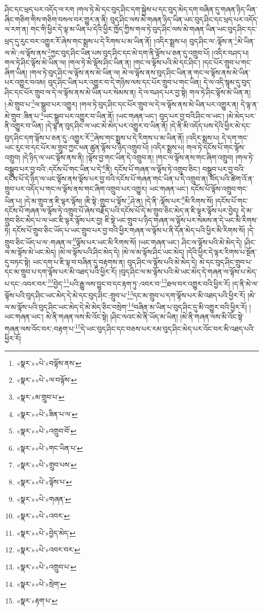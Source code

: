 ཤིང་དང་ཕྲད་པར་འདོད་ལ་རག །གལ་ཏེ་མེ་དང་བུད་ཤིང་དག་སྐྱེས་པ་དང་བུད་མེད་དག་བཞིན་དུ་གཞན་ཉིད་ཡིན་ཞིང་གཅིག་གིས་གཅིག་བསལ་བར་གྱུར་ན་ནི། བུད་ཤིང་ལས་མེ་གཞན་ཉིད་ཡིན་ཡང་བུད་ཤིང་དང་ཕྲད་པར་འདོད་ལ་རག་ན། གང་གི་ཕྱིར་དེ་ལྟ་མ་ཡིན་པ་དེའི་ཕྱིར་ཁྱོད་ཀྱིས་གལ་ཏེ་བུད་ཤིང་ལས་མེ་གཞན་ཡིན་ཡང་བུད་ཤིང་དང་ཕྲད་དུ་རུང་བར་འགྱུར་རོ་ཞེས་གང་སྨྲས་པ་དེ་རིགས་པ་མ་ཡིན་ནོ། །འདིར་སྨྲས་པ། བུད་ཤིང་ལ་:ལྟོས་ན་\footnote{«སྣར་»«པེ་»བལྟོས་ནས་}མེ་ཡིན་ལ་མེ་:ལ་ལྟོས་ནས་\footnote{«སྣར་»«པེ་»ལ་བལྟོས་}ཀྱང་བུད་ཤིང་ཡིན་པས་བུད་ཤིང་དང་མེ་དག་ནི་ལྟོས་པ་ཅན་དུ་འགྲུབ་པོ། །འདིར་བཤད་པ། གལ་ཏེ་ཤིང་ལྟོས་མེ་ཡིན་ལ། །གལ་ཏེ་མེ་ལྟོས་ཤིང་ཡིན་ན། །གང་ལ་ལྟོས་པའི་མེ་དང་ཤིང་། །དང་པོར་གྲུབ་པ་གང་ཞིག་ཡིན། །གལ་ཏེ་བུད་ཤིང་ལ་ལྟོས་ནས་མེ་ཡིན་ལ། མེ་ལ་ལྟོས་ནས་བུད་ཤིང་ཡིན་ན་གང་ལ་ལྟོས་ནས་མེ་ཡིན་པར་འགྱུར་བའམ། བུད་ཤིང་ཡིན་པར་འགྱུར་བ་དེ་གཉིས་ལས་དང་པོར་གྲུབ་པ་གང་ཡིན། དེ་ལ་འདི་སྙམ་དུ་བུད་ཤིང་དང་པོར་གྲུབ་ལ་དེ་ལ་ལྟོས་ནས་མེ་ཡིན་པར་སེམས་ན། དེ་ལ་བཤད་པར་བྱ་སྟེ། གལ་ཏེ་ཤིང་ལྟོས་མེ་ཡིན་ན། །:མེ་གྲུབ་པ་\footnote{«སྣར་»མ་གྲུབ་པ་}ལ་སྒྲུབ་པར་འགྱུར། །གལ་ཏེ་བུད་ཤིང་དང་པོར་གྲུབ་ལ་དེ་ལ་ལྟོས་ནས་མེ་ཡིན་པར་འགྱུར་ན། དེ་ལྟ་ན་མེ་གྲུབ་:ཟིན་པ་\footnote{«སྣར་»«པེ་»ཟིན་པ་ལ་}ཡང་སྒྲུབ་པར་འགྱུར་བ་ཡིན་ནོ། །ཡང་གཞན་ཡང་། བུད་པར་བྱ་བའི་ཤིང་ལ་ཡང་། །མེ་མེད་པར་ནི་འགྱུར་བ་ཡིན། །དེ་ལྟ་ན་བུད་ཤིང་ལ་ཡང་མེ་མེད་པར་འགྱུར་བ་ཡིན་ནོ། །དེ་ནི་མི་འདོད་པས་དེའི་ཕྱིར་མེ་དང་བུད་ཤིང་དག་ལྟོས་པ་ཅན་དུ་:འགྱུར་རོ་\footnote{«སྣར་»«པེ་»འགྲུབ་བོ་}ཞེས་གང་སྨྲས་པ་དེ་རིགས་པ་མ་ཡིན་ནོ། །འདིར་སྨྲས་པ། དེ་དག་གང་ཡང་རུང་བ་དང་པོར་མ་གྲུབ་ཀྱང་ཕན་ཚུན་ལྟོས་པ་ཉིད་འགྲུབ་པོ། །འདིར་སྨྲས་པ། གལ་ཏེ་དངོས་པོ་གང་ལྟོས་འགྲུབ། །དེ་ཉིད་ལ་ཡང་ལྟོས་ནས་ནི། །ལྟོས་བྱ་གང་ཡིན་དེ་འགྲུབ་ན། །གང་ལ་ལྟོས་ནས་གང་ཞིག་འགྲུབ། །གལ་ཏེ་བསྒྲུབ་པར་བྱ་བའི་:དངོས་པོ་གང་ཡིན་པ་དེ་\footnote{«སྣར་»«པེ་»གང་ཡིན་པ་}ནི། དངོས་པོ་གཞན་ལ་ལྟོས་ཏེ་འགྲུབ་ཅིང་། བསྒྲུབ་པར་བྱ་བའི་དངོས་པོ་དེ་ཉིད་ལ་ཡང་ལྟོས་ནས་ལྟོས་པར་བྱ་བའི་དངོས་པོ་གཞན་གང་ཡིན་པ་དེ་འགྲུབ་ན། བོད་པའི་ཚིག་འོ་ན་གྲུབ་པར་འདོད་པ་གང་ལ་ལྟོས་ནས་གང་ཞིག་འགྲུབ་པར་འགྱུར། ཡང་གཞན་ཡང་། དངོས་པོ་ལྟོས་འགྲུབ་གང་ཡིན་པ། །དེ་མ་གྲུབ་ན་ཇི་ལྟར་ལྟོས། །ཇི་སྟེ་:གྲུབ་པ་ལྟོས་\footnote{«སྣར་»«པེ་»གྲུབ་པས་}ཤེ་ན། །དེ་ནི་:ལྟོས་པར་\footnote{«སྣར་»«པེ་»ལྟོས་པ་}མི་རིགས་སོ། །དངོས་པོ་གང་དངོས་པོ་གཞན་ལ་ལྟོས་ཏེ་འགྲུབ་པོ་ཞེས་བརྗོད་པའི་དངོས་པོ་དེ་མ་གྲུབ་ཅིང་མེད་ན་ཇི་ལྟར་ལྟོས་པར་བྱེད། དེ་མ་གྲུབ་ཅིང་མེད་པ་ལ་ཡང་ཇི་ལྟར་ལྟོས་པར་བྱ། ཇི་སྟེ་ཡང་གྲུབ་པ་ཉིད་གཞན་ལ་ལྟོས་པར་སེམས་ན་དེ་ཡང་མི་རིགས་ཏེ། དངོས་པོ་གྲུབ་ཅིང་ཡོད་པ་ཡང་གྲུབ་པར་བྱ་བའི་ཕྱིར་གཞན་ལ་ལྟོས་པ་ནི་དོན་མེད་པའི་ཕྱིར་མི་རིགས་སོ། །དེ་གྲུབ་ཅིང་ཡོད་པ་ལ་:གཞན་ལ་\footnote{«སྣར་»«པེ་»གཞན་}ལྟོས་པར་ཡང་མི་རིགས་སོ། །ཡང་གཞན་ཡང་། ཤིང་ལ་ལྟོས་པའི་མེ་མེད་དེ། །ཤིང་ལ་མ་ལྟོས་མེ་ཡང་མེད། །མེ་ལ་ལྟོས་པའི་ཤིང་མེད་དེ། །མེ་ལ་མ་ལྟོས་ཤིང་ཡང་མེད། །དེའི་ཕྱིར་དེ་ལྟར་རིགས་པ་སྔོན་དུ་བཏང་སྟེ། ཡང་དག་པ་ཇི་ལྟ་བ་བཞིན་དུ་བརྟགས་ན། བུད་ཤིང་ལ་ལྟོས་པའི་མེ་མེད་དེ། མེ་དང་བུད་ཤིང་གྲུབ་པ་དང་མ་གྲུབ་པ་དག་ལྟོས་པར་མི་འཐད་པའི་ཕྱིར་རོ། །བུད་ཤིང་ལ་མ་ལྟོས་པའི་མེ་ཡང་མེད་དེ་གཞན་ལ་ལྟོས་པ་མེད་པ་དང་:འབར་བར་\footnote{«སྣར་»«པེ་»འབར་}བྱེད་\footnote{«སྣར་»«པེ་»བྱེད་མེད་}པའི་རྒྱུ་ལས་བྱུང་བ་དང་རྟག་ཏུ་:འབར་བ་\footnote{«སྣར་»«པེ་»འབར་བར་}ཐལ་བར་འགྱུར་བའི་ཕྱིར་རོ། །ད་ནི་མེ་ལ་ལྟོས་པའི་བུད་ཤིང་ཡང་མེད་དེ་མེ་དང་བུད་ཤིང་:གྲུབ་པ་\footnote{«སྣར་»«པེ་»འགྲུབ་པ་}དང་མ་གྲུབ་པ་དག་ལྟོས་པར་མི་འཐད་པའི་ཕྱིར་རོ། །མེ་ལ་མ་ལྟོས་པའི་བུད་ཤིང་ཡང་མེད་དེ་མེ་མེད་ཅིང་བསྲེག་\footnote{«སྣར་»«པེ་»སྲེག་}བཞིན་མ་ཡིན་པ་བུད་ཤིང་དུ་མི་འགྱུར་བའི་ཕྱིར་རོ། །ཡང་གཞན་ཡང་། མེ་ནི་གཞན་ལས་མི་འོང་སྟེ། །ཤིང་ལའང་མེ་ནི་ཡོད་མ་ཡིན། །མེ་ནི་གཞན་ལས་མི་འོང་སྟེ་གཞན་ལས་འོང་བར་:བརྟག་པ་\footnote{«སྣར་»རྟག་པ་}དེ་ཡང་བུད་ཤིང་དང་བཅས་པར་རམ་བུད་ཤིང་མེད་པར་འོང་བར་མི་འཐད་པའི་ཕྱིར་རོ། 